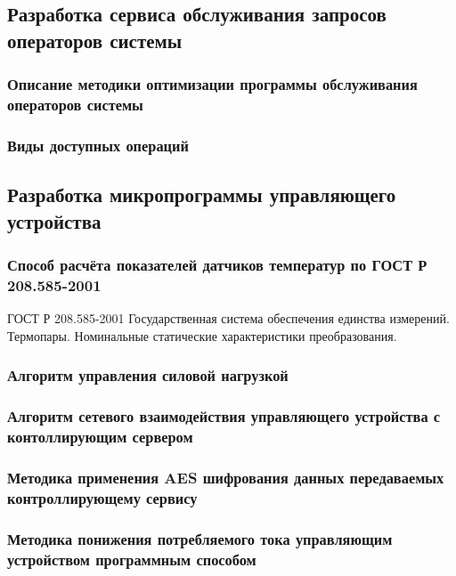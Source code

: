 \subsection{Разработка сервиса обслуживания запросов операторов системы}
\subsubsection{Описание методики оптимизации программы обслуживания операторов
системы}
\subsubsection{Виды доступных операций}

\subsection{Разработка микропрограммы управляющего устройства}
\subsubsection{Способ расчёта показателей датчиков температур по
ГОСТ Р 208.585-2001}
ГОСТ Р 208.585-2001 Государственная система обеспечения единства измерений.
Термопары. Номинальные статические характеристики преобразования.
\subsubsection{Алгоритм управления силовой нагрузкой}

\subsubsection{Алгоритм сетевого взаимодействия управляющего устройства
с контоллирующим сервером}

\subsubsection{Методика применения AES шифрования данных передаваемых
контроллирующему сервису}

\subsubsection{Методика понижения потребляемого тока управляющим устройством
программным способом}


